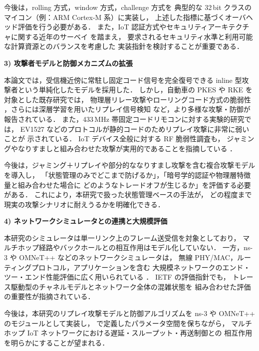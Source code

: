 \documentclass[twocolumn,10pt,a4paper]{jsarticle}
\begin{document}
今後は，rolling 方式，window 方式，challenge 方式を
典型的な 32\,bit クラスのマイコン（例：ARM Cortex-M 系）に実装し，
上述した指標に基づくオーバヘッド評価を行う必要がある．
また，IoT 認証方式やセキュリティアーキテクチャに関する近年のサーベイ
\cite{ElHajj2019IoTAuth,Dritsas2025IoTSecurity}を踏まえ，
要求されるセキュリティ水準と利用可能な計算資源とのバランスを考慮した
実装指針を検討することが重要である．

\vspace{0.5em}
\noindent\textbf{3) 攻撃者モデルと防御メカニズムの拡張}\par
本論文では，受信機近傍に常駐し固定コード信号を完全復号できる
inline 型攻撃者という単純化したモデルを採用した．
しかし，自動車の PKES や RKE を対象とした既存研究では，
物理層リレー攻撃\cite{Francillon2011PKES}やローリングコード方式の脆弱性
\cite{Garcia2016RKE}，さらには深層学習を用いたリプレイ信号検知
\cite{AbuAlHaija2022}など，より多様な攻撃・防御が報告されている．
また，433\,MHz 帯固定コードリモコンに対する実験的研究では，
EV1527 などのプロトコルが静的コードのためリプレイ攻撃に非常に弱いことが
示されている\cite{Mykhaylova2024RCReplay}．
IoT デバイス全般に対する RF 脆弱性調査も，
ジャミングやなりすましと組み合わせた攻撃が実用的であることを指摘している
\cite{Anthi2024RFVuln}．

今後は，ジャミング＋リプレイや部分的ななりすまし攻撃を含む複合攻撃モデルを導入し，
「状態管理のみでどこまで防げるか」，「暗号学的認証や物理層特徴量と組み合わせた場合に
どのようなトレードオフが生じるか」を評価する必要がある．
これにより，本研究で扱った状態管理ベースの手法が，
どの程度まで現実の攻撃シナリオに耐えうるかを明確化できる．

\vspace{0.5em}
\noindent\textbf{4) ネットワークシミュレータとの連携と大規模評価}\par
本研究のシミュレータは単一リンク上のフレーム送受信を対象としており，
マルチホップ経路やバックホールとの相互作用はモデル化していない．
一方，ns-3 や OMNeT++ などのネットワークシミュレータは，
無線 PHY/MAC，ルーティングプロトコル，アプリケーションを含む
大規模ネットワークのエンド・ツー・エンド性能評価に広く用いられている
\cite{ns3Tutorial,OMNeTppIntro}．
IETF の評価指針\cite{RFC8868}でも，
トレース駆動型のチャネルモデルとネットワーク全体の混雑状態を
組み合わせた評価の重要性が指摘されている．

今後は，本研究のリプレイ攻撃モデルと防御アルゴリズムを
ns-3 や OMNeT++ のモジュールとして実装し，
\cite{ReplaySimReadmeJP}で定義したパラメータ空間を保ちながら，
マルチホップ IoT ネットワークにおける遅延・スループット・再送制御との
相互作用を明らかにすることが望まれる．
\end{document}

